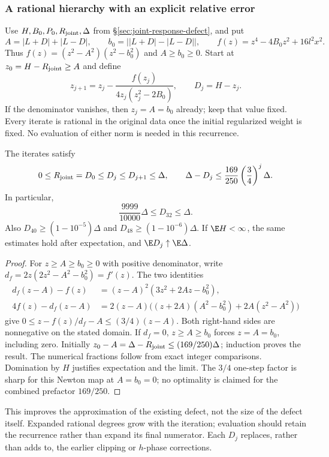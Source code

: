 \subsubsection{A rational hierarchy with an explicit relative error}
Use $H,B_0,P_0,R_{\rm joint},\Delta$ from
\S\ref{sec:joint-response-defect}, and put
\[
 A=|L+D|+|L-D|,\qquad
 b_0=\bigl||L+D|-|L-D|\bigr|,\qquad
 f(z)=z^4-4B_0z^2+16l^2x^2.
\]
Thus $f(z)=(z^2-A^2)(z^2-b_0^2)$ and $A\ge b_0\ge0$.
Start at $z_0=H-R_{\rm joint}\ge A$ and define
\[
 z_{j+1}=z_j-\frac{f(z_j)}{4z_j(z_j^2-2B_0)},\qquad
 D_j=H-z_j.
\]
If the denominator vanishes, then $z_j=A=b_0$ already; keep that
value fixed. Every iterate is rational in the original data once the
initial regularized weight is fixed. No evaluation of either norm is
needed in this recurrence.
\begin{theorem}
\label{thm:joint-defect-hierarchy}
The iterates satisfy
\[
 0\le R_{\rm joint}=D_0\le D_j\le D_{j+1}\le\Delta,
 \qquad
 \Delta-D_j\le\frac{169}{250}\left(\frac34\right)^j\Delta.
\]
In particular,
\[
 \boxed{\quad \frac{9999}{10000}\Delta\le D_{32}\le\Delta.\quad}
\]
Also $D_{40}\ge(1-10^{-5})\Delta$ and
$D_{48}\ge(1-10^{-6})\Delta$. If $\E H<\infty$, the same estimates
hold after expectation, and $\E D_j\uparrow\E\Delta$.
\end{theorem}
\begin{proof}
For $z\ge A\ge b_0\ge0$ with positive denominator, write
$d_f=2z(2z^2-A^2-b_0^2)=f'(z)$. The two identities
\begin{align*}
 d_f(z-A)-f(z)
   &=(z-A)^2(3z^2+2Az-b_0^2),\\
 4f(z)-d_f(z-A)
   &=2(z-A)\bigl((z+2A)(A^2-b_0^2)+2A(z^2-A^2)\bigr)
\end{align*}
give $0\le z-f(z)/d_f-A\le(3/4)(z-A)$.
Both right-hand sides are nonnegative on the stated domain.
If $d_f=0$, $z\ge A\ge b_0$ forces $z=A=b_0$, including zero.
Initially $z_0-A=\Delta-R_{\rm joint}\le(169/250)\Delta$;
induction proves the result. The numerical fractions follow from exact
integer comparisons. Domination by $H$ justifies expectation and the
limit. The $3/4$ one-step factor is sharp for this Newton map at
$A=b_0=0$; no optimality is claimed for the combined prefactor $169/250$.
\end{proof}
This improves the approximation of the existing defect, not the size of
the defect itself. Expanded rational degrees grow with the iteration;
evaluation should retain the recurrence rather than expand its final
numerator. Each $D_j$ replaces, rather than adds to, the earlier clipping
or $h$-phase corrections.

